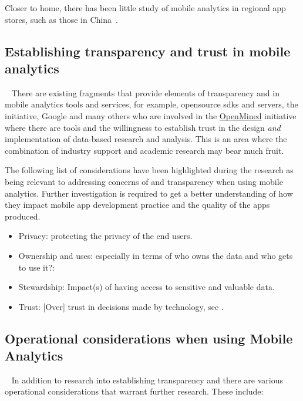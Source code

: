 Closer to home, there has been little study of mobile analytics in regional app stores, such as those in China~.


\subsection{Establishing transparency and trust in mobile analytics}~\label{fw-establishing-transparency-and-trust-in-mobile-analytics}
There are existing fragments that provide elements of transparency and  in mobile analytics tools and services, for example, opensource \Glspl{sdk} and servers, the  initiative, Google and many others who are involved in the \href{https://www.openmined.org/}{OpenMined} initiative~ %
where there are tools and the willingness to establish trust in the design \emph{and} implementation of data-based research and analysis. This is an area where the combination of industry support and academic research may bear much fruit. 

The following list of considerations have been highlighted during the research as being relevant to addressing concerns of  and transparency when using mobile analytics. Further investigation is required to get a better understanding of how they impact mobile app development practice and the quality of the apps produced.

\begin{itemize}
    \item Privacy: protecting the privacy of the end users. 
    \item Ownership and uses: especially in terms of who owns the data and who gets to use it?:
    \item Stewardship: Impact(s) of having access to sensitive and valuable data.  
    \item Trust: [Over] trust in decisions made by technology, see .
\end{itemize}


\subsection{Operational considerations when using Mobile Analytics}~\label{fw-operational-considerations-topic}
In addition to research into establishing transparency and  there are various operational considerations that warrant further research. These include: 

